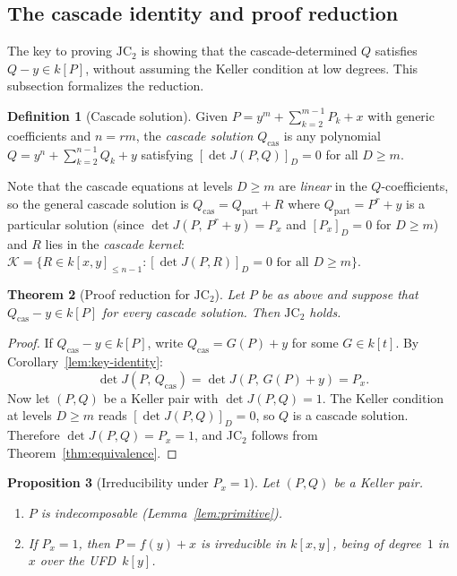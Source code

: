 \documentclass[12pt,a4paper]{article}
\newtheorem{theorem}{Theorem}[section]
\newtheorem{proposition}[theorem]{Proposition}
\theoremstyle{definition}
\newtheorem{definition}[theorem]{Definition}
\newcommand{\kk}{k}
\begin{document}
\subsection{The cascade identity and proof reduction}\label{sec:cascade-identity}

The key to proving $\mathrm{JC}_2$ is showing that the cascade-determined
$Q$ satisfies $Q - y \in \kk[P]$, without assuming the Keller condition at
low degrees. This subsection formalizes the reduction.

\begin{definition}[Cascade solution]\label{def:cascade-sol}
Given $P = y^m + \sum_{k=2}^{m-1} P_k + x$ with generic coefficients and
$n = rm$, the \emph{cascade solution} $Q_{\mathrm{cas}}$ is any polynomial
$Q = y^n + \sum_{k=2}^{n-1} Q_k + y$ satisfying
$[\det J(P, Q)]_D = 0$ for all $D \geq m$.
\end{definition}

Note that the cascade equations at levels $D \geq m$ are \emph{linear} in the
$Q$-coefficients, so the general cascade solution is
$Q_{\mathrm{cas}} = Q_{\mathrm{part}} + R$
where $Q_{\mathrm{part}} = P^r + y$ is a particular solution
(since $\det J(P,\, P^r + y) = P_x$ and $[P_x]_D = 0$ for $D \geq m$)
and $R$ lies in the \emph{cascade kernel}:
$\mathcal{K} = \{R \in \kk[x,y]_{\leq n-1} : [\det J(P,R)]_D = 0
\text{ for all } D \geq m\}$.

\begin{theorem}[Proof reduction for $\mathrm{JC}_2$]\label{thm:proof-reduction}
Let $P$ be as above and suppose that $Q_{\mathrm{cas}} - y \in \kk[P]$
for every cascade solution. Then $\mathrm{JC}_2$ holds.
\end{theorem}

\begin{proof}
If $Q_{\mathrm{cas}} - y \in \kk[P]$, write
$Q_{\mathrm{cas}} = G(P) + y$ for some $G \in \kk[t]$.
By Corollary~\ref{lem:key-identity}:
\[
  \det J(P,\, Q_{\mathrm{cas}}) = \det J(P,\, G(P) + y) = P_x.
\]
Now let $(P, Q)$ be a Keller pair with $\det J(P,Q) = 1$.
The Keller condition at levels $D \geq m$ reads $[\det J(P,Q)]_D = 0$,
so $Q$ is a cascade solution.
Therefore $\det J(P, Q) = P_x = 1$, and JC$_2$ follows from
Theorem~\ref{thm:equivalence}.
\end{proof}

\begin{proposition}[Irreducibility under $P_x = 1$]\label{prop:P-irred}
Let $(P,Q)$ be a Keller pair.
\begin{enumerate}
\item[\textup{(a)}] $P$ is indecomposable
  (Lemma~\textup{\ref{lem:primitive}}).
\item[\textup{(b)}] If $P_x = 1$, then $P = f(y) + x$ is irreducible
  in $\kk[x,y]$, being of degree~$1$ in~$x$ over the UFD~$\kk[y]$.
\end{enumerate}
\end{proposition}
\end{document}

